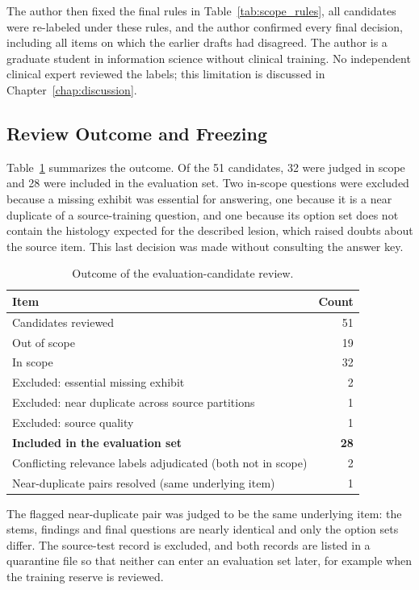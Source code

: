 The author then fixed the final rules in Table~\ref{tab:scope_rules}, all candidates were re-labeled under these rules, and the author confirmed every final decision, including all items on which the earlier drafts had disagreed. The author is a graduate student in information science without clinical training.  No independent clinical expert reviewed the labels; this limitation is discussed in Chapter~\ref{chap:discussion}.

\subsection{Review Outcome and Freezing}

Table~\ref{tab:review_outcome} summarizes the outcome. Of the 51 candidates, 32 were judged in scope and 28 were included in the evaluation set. Two in-scope questions were excluded because a missing exhibit was essential for answering, one because it is a near duplicate of a source-training question, and one because its option set does not contain the histology expected for the described lesion, which raised doubts about the source item. This last decision was made without consulting the answer key.

\begin{table}[H]
\centering
\caption{Outcome of the evaluation-candidate review.}
\label{tab:review_outcome}
\begin{tabular}{lr}
\toprule
Item & Count \\
\midrule
Candidates reviewed & 51 \\
\quad Out of scope & 19 \\
\quad In scope & 32 \\
\qquad Excluded: essential missing exhibit & 2 \\
\qquad Excluded: near duplicate across source partitions & 1 \\
\qquad Excluded: source quality & 1 \\
\textbf{Included in the evaluation set} & \textbf{28} \\
\midrule
Conflicting relevance labels adjudicated (both not in scope) & 2 \\
Near-duplicate pairs resolved (same underlying item) & 1 \\
\bottomrule
\end{tabular}
\end{table}

The flagged near-duplicate pair was judged to be the same underlying item: the stems, findings and final questions are nearly identical and only the option sets differ. The source-test record is excluded, and both records are listed in a quarantine file so that neither can enter an evaluation set later, for example when the training reserve is reviewed.

